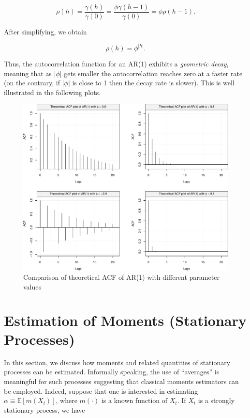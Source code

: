\documentclass[]{book}
\theoremstyle{definition}
\theoremstyle{definition}
\theoremstyle{definition}
\theoremstyle{remark}
\begin{document}
\[\rho \left( h \right) = \frac{{\gamma \left( h \right)}}{{\gamma \left( 0 \right)}} = \frac{{\phi \gamma \left( {h - 1} \right)}}{{\gamma \left( 0 \right)}} = \phi \rho \left( {h - 1} \right).\]

After simplifying, we obtain

\[\rho \left( h \right) = {\phi^{|h|}}.\]

Thus, the autocorrelation function for an AR(1) exhibits a
\emph{geometric decay}, meaning that as \(|\phi|\) gets smaller the
autocorrelation reaches zero at a faster rate (on the contrary, if
\(|\phi|\) is close to 1 then the decay rate is slower). This is well
illustrated in the following plots.

\begin{figure}

{\centering \includegraphics{ts_files/figure-latex/AR1theoACF-1} 

}

\caption{Comparison of theoretical ACF of AR(1) with different parameter values}\label{fig:AR1theoACF}
\end{figure}

\section{Estimation of Moments (Stationary
Processes)}\label{estimation-of-moments-stationary-processes}

In this section, we discuss how moments and related quantities of
stationary processes can be estimated. Informally speaking, the use of
``averages'' is meaningful for such processes suggesting that classical
moments estimators can be employed. Indeed, suppose that one is
interested in estimating \(\alpha \equiv \mathbb{E}[m (X_t)]\), where
\(m(\cdot)\) is a known function of \(X_t\). If \(X_t\) is a strongly
stationary process, we have
\end{document}
